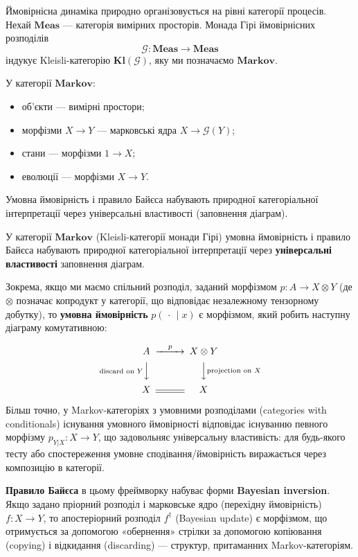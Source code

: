 \documentclass[a4paper,12pt]{article}
\begin{document}
Ймовірнісна динаміка природно організовується на рівні категорії процесів. Нехай $\mathbf{Meas}$ — категорія вимірних просторів. Монада Гірі ймовірнісних розподілів
\[
\mathcal{G} : \mathbf{Meas} \to \mathbf{Meas}
\]
індукує Kleisli-категорію $\mathbf{Kl}(\mathcal{G})$, яку ми позначаємо $\mathbf{Markov}$. 

У категорії $\mathbf{Markov}$:
\begin{itemize}
    \item об’єкти — вимірні простори;
    \item морфізми $X \to Y$ — марковські ядра $X \to \mathcal{G}(Y)$;
    \item стани — морфізми $1 \to X$;
    \item еволюції — морфізми $X \to Y$.
\end{itemize}

Умовна ймовірність і правило Байєса набувають природної категоріальної інтерпретації через універсальні властивості (заповнення діаграм).

У категорії $\mathbf{Markov}$ (Kleisli-категорії монади Гірі) умовна ймовірність і правило Байєса набувають природної категоріальної інтерпретації через \textbf{універсальні властивості} заповнення діаграм.

Зокрема, якщо ми маємо спільний розподіл, заданий морфізмом $p : A \to X \otimes Y$ (де $\otimes$ позначає копродукт у категорії, що відповідає незалежному тензорному добутку), то \textbf{умовна ймовірність} $p(\,\cdot\,\mid x)$ є морфізмом, який робить наступну діаграму комутативною:

\[
\begin{CD}
A @>p>> X \otimes Y \\
@V{\text{discard on }Y}VV @VV{\text{projection on }X}V \\
X @= X
\end{CD}
\]

Більш точно, у Markov-категоріях з умовними розподілами (categories with conditionals) існування умовного ймовірності відповідає існуванню певного морфізму $p_{Y|X} : X \to Y$, що задовольняє універсальну властивість: для будь-якого тесту або спостереження умовне сподівання/ймовірність виражається через композицію в категорії.

\textbf{Правило Байєса} в цьому фреймворку набуває форми \textbf{Bayesian inversion}. Якщо задано пріорний розподіл і марковське ядро (перехідну ймовірність) $f : X \to Y$, то апостеріорний розподіл $f^\dagger$ (Bayesian update) є морфізмом, що отримується за допомогою «обернення» стрілки за допомогою копіювання (copying) і відкидання (discarding) — структур, притаманних Markov-категоріям. 
\end{document}
